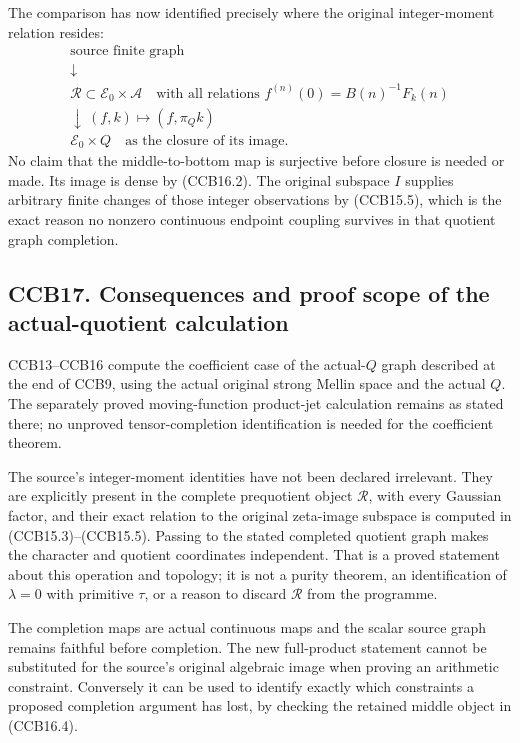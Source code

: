 The comparison has now identified precisely where the original
integer-moment relation resides: \[
\begin{array}{c}
\text{source finite graph}\\[2pt]
\downarrow\\[2pt]
\mathscr R\subset\mathscr E_0\times\mathcal A
\quad\text{with all relations }f^{(n)}(0)=B(n)^{-1}F_k(n)\\[2pt]
\downarrow\ (f,k)\mapsto(f,\pi_Qk)\\[2pt]
\mathscr E_0\times Q\quad\text{as the closure of its image}.
\end{array}
\tag{CCB16.4}
\] No claim that the middle-to-bottom map is surjective before closure
is needed or made. Its image is dense by (CCB16.2). The original
subspace \(I\) supplies arbitrary finite changes of those integer
observations by (CCB15.5), which is the exact reason no nonzero
continuous endpoint coupling survives in that quotient graph completion.

\subsection{CCB17. Consequences and proof scope of the actual-quotient
calculation}\label{ccb17.-consequences-and-proof-scope-of-the-actual-quotient-calculation}

CCB13--CCB16 compute the coefficient case of the actual-\(Q\) graph
described at the end of CCB9, using the actual original strong Mellin
space and the actual \(Q\). The separately proved moving-function
product-jet calculation remains as stated there; no unproved
tensor-completion identification is needed for the coefficient theorem.

The source's integer-moment identities have not been declared
irrelevant. They are explicitly present in the complete prequotient
object \(\mathscr R\), with every Gaussian factor, and their exact
relation to the original zeta-image subspace is computed in
(CCB15.3)--(CCB15.5). Passing to the stated completed quotient graph
makes the character and quotient coordinates independent. That is a
proved statement about this operation and topology; it is not a purity
theorem, an identification of \(\lambda=0\) with primitive \(\tau\), or
a reason to discard \(\mathscr R\) from the programme.

The completion maps are actual continuous maps and the scalar source
graph remains faithful before completion. The new full-product statement
cannot be substituted for the source's original algebraic image when
proving an arithmetic constraint. Conversely it can be used to identify
exactly which constraints a proposed completion argument has lost, by
checking the retained middle object in (CCB16.4).


